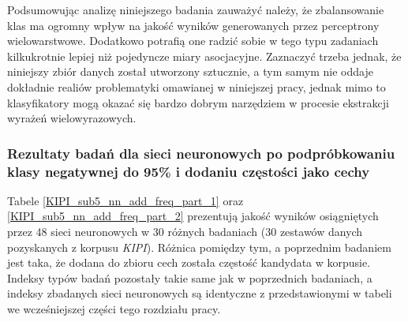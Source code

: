 \par
Podsumowując analizę niniejszego badania zauważyć należy, że zbalansowanie klas ma ogromny wpływ na jakość wyników generowanych przez perceptrony wielowarstwowe.
Dodatkowo potrafią one radzić sobie w tego typu zadaniach kilkukrotnie lepiej niż pojedyncze miary asocjacyjne.
Zaznaczyć trzeba jednak, że niniejszy zbiór danych został utworzony sztucznie, a tym samym nie oddaje dokładnie realiów problematyki omawianej w niniejszej pracy, jednak mimo to klasyfikatory mogą okazać się bardzo dobrym narzędziem w procesie ekstrakcji wyrażeń wielowyrazowych.


\subsubsection{Rezultaty badań dla sieci neuronowych po podpróbkowaniu klasy negatywnej do 95\% i dodaniu częstości jako cechy}
Tabele \ref{KIPI_sub5_nn_add_freq_part_1} oraz \ref{KIPI_sub5_nn_add_freq_part_2} prezentują jakość wyników osiągniętych przez 48 sieci neuronowych w 30 różnych badaniach (30 zestawów danych pozyskanych z korpusu \emph{KIPI}).
Różnica pomiędzy tym, a poprzednim badaniem jest taka, że dodana do zbioru cech została częstość kandydata w korpusie.
Indeksy typów badań pozostały takie same jak w poprzednich badaniach, a indeksy zbadanych sieci neuronowych są identyczne z przedstawionymi w tabeli we wcześniejszej części tego rozdziału pracy.

